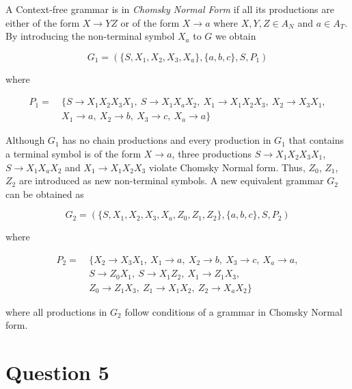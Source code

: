 A Context-free grammar is in \textit{Chomsky Normal Form} if all its productions are either of the form $X\rightarrow YZ$ or of the form $X\rightarrow a$ where $X,Y,Z \in A_N$ and $a\in A_T$.
By introducing the non-terminal symbol $X_a$ to $G$ we obtain

\begin{equation}
G_1 = (\{S, X_1, X_2, X_3, X_a\},\{a, b, c\},S,P_1)
\end{equation}

where

\begin{equation}
\begin{aligned}
P_1 =\ & \{ S\rightarrow X_1 X_2 X_3 X_1,\ S\rightarrow X_1 X_a X_2,\ X_1 \rightarrow X_1 X_2 X_3,\ X_2 \rightarrow X_3 X_1,\\
& X_1 \rightarrow a,\ X_2 \rightarrow b,\ X_3 \rightarrow c,\ X_a \rightarrow a\}
\end{aligned}
\end{equation}

Although $G_1$ has no chain productions and every production in $G_1$ that contains a terminal symbol is of the form $X\rightarrow a$, three productions $S\rightarrow X_1 X_2 X_3 X_1$, $S\rightarrow X_1 X_a X_2$ and $X_1 \rightarrow X_1 X_2 X_3$ violate Chomsky Normal form.
Thus, $Z_0$, $Z_1$, $Z_2$ are introduced as new non-terminal symbols.
A new equivalent grammar $G_2$ can be obtained as

\begin{equation}
G_2 = (\{S, X_1, X_2, X_3, X_a, Z_0, Z_1, Z_2\},\{a, b, c\},S,P_2)
\end{equation}

where

\begin{equation}
\begin{aligned}
P_2 =\ & \{ X_2 \rightarrow X_3 X_1,\ X_1 \rightarrow a,\ X_2 \rightarrow b,\ X_3 \rightarrow c,\ X_a \rightarrow a, \\
& S\rightarrow Z_0X_1,\ S\rightarrow X_1Z_2,\ X_1\rightarrow Z_1X_3, \\
& Z_0\rightarrow Z_1X_3,\ Z_1\rightarrow X_1X_2,\ Z_2\rightarrow X_aX_2 \}
\end{aligned}
\end{equation}

where all productions in $G_2$ follow conditions of a grammar in Chomsky Normal form.

\section*{Question 5}

